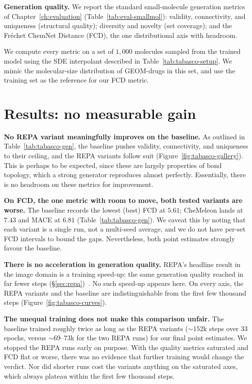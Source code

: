\documentclass[12pt,a4paper,twoside]{report}
\begin{document}
\textbf{Generation quality.} We report the standard small-molecule generation metrics of Chapter~\ref{ch:evaluation} (Table~\ref{tab:eval-smallmol}): validity, connectivity, and uniqueness (structural quality); diversity and novelty (set coverage); and the Fr\'echet ChemNet Distance (FCD), the one distributional axis with headroom.

We compute every metric on a set of $1{,}000$ molecules sampled from the trained model using the SDE interpolant described in Table~\ref{tab:tabasco-setup}. We mimic the molecular-size distribution of GEOM-drugs in this set, and use the training set as the reference for our FCD metric.

\section{Results: no measurable gain}
\label{sec:tabasco-results}

\textbf{No REPA variant meaningfully improves on the baseline.} As outlined in Table~\ref{tab:tabasco-gen}, the baseline pushes validity, connectivity, and uniqueness to their ceiling, and the REPA variants follow suit (Figure~\ref{fig:tabasco-gallery}). This is perhaps to be expected, since these are largely properties of bond topology, which a strong generator reproduces almost perfectly. Essentially, there is no headroom on these metrics for improvement.



\textbf{On FCD, the one metric with room to move, both tested variants are worse.} The baseline records the lowest (best) FCD at $5.61$; CheMeleon lands at $7.43$ and MACE at $6.81$ (Table~\ref{tab:tabasco-gen}). We caveat this by noting that each variant is a single run, not a multi-seed average, and we do not have per-set FCD intervals to bound the gaps. Nevertheless, both point estimates strongly favour the baseline.

\textbf{There is no acceleration in generation quality.} REPA's headline result in the image domain is a training speed-up: the same generation quality reached in far fewer steps (\S\ref{sec:repa})~\cite{REPA}. No such speed-up appears here. On every axis, the REPA variants and the baseline are indistinguishable from the first few thousand steps (Figure~\ref{fig:tabasco-curves}).

\textbf{The unequal training does not make this comparison unfair.} The baseline trained roughly twice as long as the REPA variants (${\sim}152$k steps over 33 epochs, versus ${\sim}69$--$73$k for the two REPA runs) for our final point estimates. We stopped the REPA runs early on purpose. With the quality metrics saturated and FCD flat or worse, there was no evidence that further training would change the verdict. Nor did shorter runs cost the variants anything on the saturated axes, which always plateau within the first few thousand steps.
\end{document}
